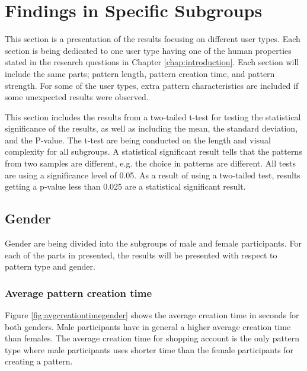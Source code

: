 \section{Findings in Specific Subgroups}\label{sec:findingsSpecificSubgroups}

  This section is a presentation of the results focusing on different user types. Each section is being dedicated to one user type having one of the human properties stated in the research questions in Chapter \ref{chap:introduction}. Each section will include the same parts; pattern length, pattern creation time, and pattern strength. For some of the user types, extra pattern characteristics are included if some unexpected results were observed. 

  This section includes the results from a two-tailed t-test for testing the statistical significance of the results, as well as including the mean, the standard deviation, and the P-value. The t-test are being conducted on the length and visual complexity for all subgroups. A statistical significant result tells that the patterns from two samples are different, e.g. the choice in patterns are different. All tests are using a significance level of 0.05. As a result of using a two-tailed test, results getting a p-value less than 0.025 are a statistical significant result. 

	\subsection{Gender}
    Gender are being divided into the subgroups of male and female participants. For each of the parts in presented, the results will be presented with respect to pattern type and gender. 

    \subsubsection{Average pattern creation time}
    Figure \ref{fig:avgcreationtimegender} shows the average creation time in seconds for both genders. Male participants have in general a higher average creation time than females. The average creation time for shopping account is the only pattern type where male participants uses shorter time than the female participants for creating a pattern.

